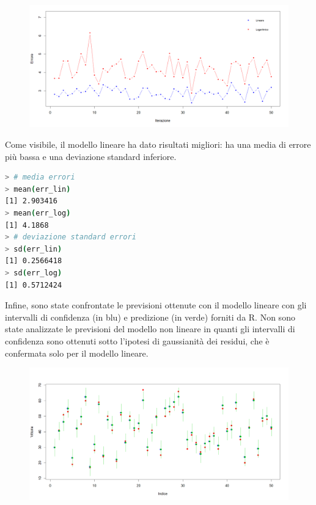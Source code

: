 \documentclass[11pt,a4paper]{article}
\begin{document}
\begin{figure}[H]
	\begin{center}
		\vspace{-0.4cm}
		\hspace*{-2.7cm}
		\includegraphics[scale=0.4]{imgs/results.png}
		\vspace{-1.5cm}
	\end{center}
\end{figure}

Come visibile, il modello lineare ha dato risultati migliori: 
ha una media di errore più bassa e una deviazione standard inferiore.

\begin{lstlisting}[language=bash,basicstyle=\tiny,tabsize=2,frame = single]
> # media errori
> mean(err_lin)
[1] 2.903416
> mean(err_log)
[1] 4.1868
> # deviazione standard errori
> sd(err_lin)
[1] 0.2566418
> sd(err_log)
[1] 0.5712424
\end{lstlisting}

Infine, sono state confrontate le previsioni ottenute con il modello lineare con gli intervalli di confidenza (in blu) e predizione (in verde) forniti da R.
Non sono state analizzate le previsioni del modello non lineare in quanti gli intervalli di confidenza sono ottenuti sotto l'ipotesi di gaussianità dei residui, che è confermata solo per il modello lineare.

\begin{figure}[H]
	\begin{center}
		\vspace{-0.4cm}
		\hspace*{-2.7cm}
		\includegraphics[scale=0.65]{imgs/prediction.png}
		\vspace{-1.5cm}
	\end{center}
\end{figure}
\end{document}
